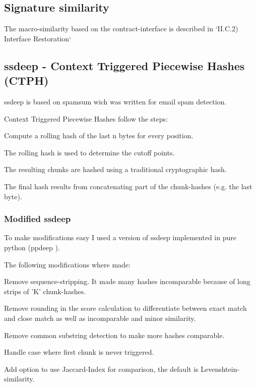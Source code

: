 \documentclass[../main.tex]{subfiles}
\begin{document}

\subsection{Signature similarity}

The macro-similarity based on the contract-interface is described in `II.C.2) Interface Restoration`

\subsection{ssdeep - Context Triggered Piecewise Hashes (CTPH)}
ssdeep is based on spamsum\cite{spamsum} wich was written for email spam detection.

Context Triggered Piecewise Hashes follow the steps:
\begin{ol}
  \item Compute a rolling hash of the last n bytes for every position.
  \item The rolling hash is used to determine the cutoff points.
  \item The resulting chunks are hashed using a traditional cryptographic hash.
  \item The final hash results from concatenating part of the chunk-hashes (e.g. the last byte).
\end{ol}

\subsubsection{Modified ssdeep}
To make modifications easy I used a version of ssdeep implemented in pure python (ppdeep \cite{ppdeep}).

The following modifications where made:
\begin{ul}
  \item Remove sequence-stripping. It made many hashes incomparable because of long strips of 'K' chunk-hashes.
  \item Remove rounding in the score calculation to differentiate between exact match and close match as well as incomparable and minor similarity.
  \item Remove common substring detection to make more hashes comparable.
  \item Handle case where first chunk is never triggered.
  \item Add option to use Jaccard-Index for comparison, the default is Levenshtein-similarity.
\end{ul}
\end{document}
